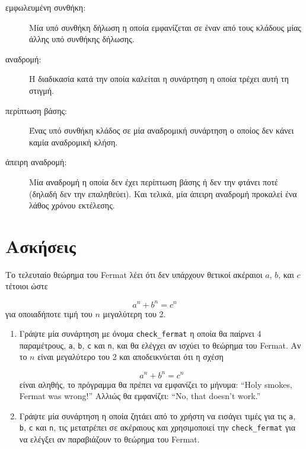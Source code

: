 \documentclass[10pt]{book}
\begin{document}
\begin{description}
\item[εμφωλευμένη συνθήκη:]  Μία υπό συνθήκη δήλωση η οποία εμφανίζεται σε
έναν από τους κλάδους μίας άλλης υπό συνθήκης δήλωσης.

\item[αναδρομή:]  Η διαδικασία κατά την οποία καλείται η συνάρτηση η οποία
τρέχει αυτή τη στιγμή.

\item[περίπτωση βάσης:]  Ένας υπό συνθήκη κλάδος σε μία αναδρομική συνάρτηση
ο οποίος δεν κάνει καμία αναδρομική κλήση.

\item[άπειρη αναδρομή:]  Μία αναδρομή η οποία δεν έχει περίπτωση βάσης ή δεν
την φτάνει ποτέ (δηλαδή δεν την επαληθεύει). Και τελικά, μία άπειρη αναδρομή προκαλεί ένα λάθος χρόνου εκτέλεσης.

\end{description}

\section{Ασκήσεις}

\begin{exercise}

Το τελευταίο θεώρημα του Fermat λέει ότι δεν υπάρχουν θετικοί ακέραιοι $a$, $b$, και $c$ τέτοιοι ώστε

\[ a^n + b^n = c^n \]
%
για οποιαδήποτε τιμή του $n$ μεγαλύτερη του 2.

\begin{enumerate}

\item Γράψτε μία συνάρτηση με όνομα \verb"check_fermat" η οποία
θα παίρνει 4 παραμέτρους, {\tt a}, {\tt b}, {\tt c} και {\tt n}, 
και θα ελέγχει αν ισχύει το θεώρημα του Fermat. Αν το $n$ είναι μεγαλύτερο
του 2 και αποδεικνύεται ότι η σχέση

\[a^n + b^n = c^n \]
%
είναι αληθής, το πρόγραμμα θα πρέπει να εμφανίζει το μήνυμα:
``Holy smokes, Fermat was wrong!''  Αλλιώς θα εμφανίζει:
``No, that doesn't work.''

\item Γράψτε μία συνάρτηση η οποία ζητάει από το χρήστη να εισάγει τιμές
για τις  {\tt a}, {\tt b}, {\tt c} και {\tt n}, τις μετατρέπει
σε ακέραιους και χρησιμοποιεί την \verb"check_fermat" για να ελέγξει αν
παραβιάζουν το θεώρημα του  Fermat.
\\

\end{enumerate}

\end{exercise}
\end{document}
